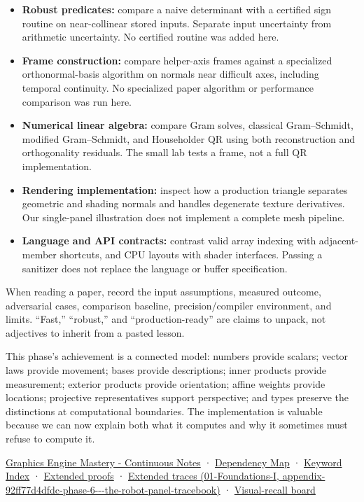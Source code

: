 \begin{itemize}
\tightlist
\item
  \textbf{Robust predicates:} compare a naive determinant with a certified sign routine on near-collinear stored inputs. Separate input uncertainty from arithmetic uncertainty. No certified routine was added here.
\item
  \textbf{Frame construction:} compare helper-axis frames against a specialized orthonormal-basis algorithm on normals near difficult axes, including temporal continuity. No specialized paper algorithm or performance comparison was run here.
\item
  \textbf{Numerical linear algebra:} compare Gram solves, classical Gram--Schmidt, modified Gram--Schmidt, and Householder QR using both reconstruction and orthogonality residuals. The small lab tests a frame, not a full QR implementation.
\item
  \textbf{Rendering implementation:} inspect how a production triangle separates geometric and shading normals and handles degenerate texture derivatives. Our single-panel illustration does not implement a complete mesh pipeline.
\item
  \textbf{Language and API contracts:} contrast valid array indexing with adjacent-member shortcuts, and CPU layouts with shader interfaces. Passing a sanitizer does not replace the language or buffer specification.
\end{itemize}

When reading a paper, record the input assumptions, measured outcome, adversarial cases, comparison baseline, precision/compiler environment, and limits. ``Fast,'' ``robust,'' and ``production-ready'' are claims to unpack, not adjectives to inherit from a pasted lesson.

This phase's achievement is a connected model: numbers provide scalars; vector laws provide movement; bases provide descriptions; inner products provide measurement; exterior products provide orientation; affine weights provide locations; projective representatives support perspective; and types preserve the distinctions at computational boundaries. The implementation is valuable because we can now explain both what it computes and why it sometimes must refuse to compute it.

\href{Graphics\%20Engine\%20Mastery\%20-\%20Continuous\%20Notes}{Graphics Engine Mastery - Continuous Notes} · \hyperref[appendix-4ad47bdd269a]{Dependency Map} · \hyperref[appendix-a6d556a4ef50]{Keyword Index} · \hyperref[02-foundations-ii-ch039-phase-6---geometry-reconstruction-proofs]{Extended proofs} · \href{../01-Foundations-I/main.pdf\#nameddest=appendix-92ff77d4dfdc-phase-6---the-robot-panel-tracebook}{Extended traces (01-Foundations-I, appendix-92ff77d4dfdc-phase-6-\/-\/-the-robot-panel-tracebook)} · \hyperref[appendix-38d9c8aca357]{Visual-recall board}

